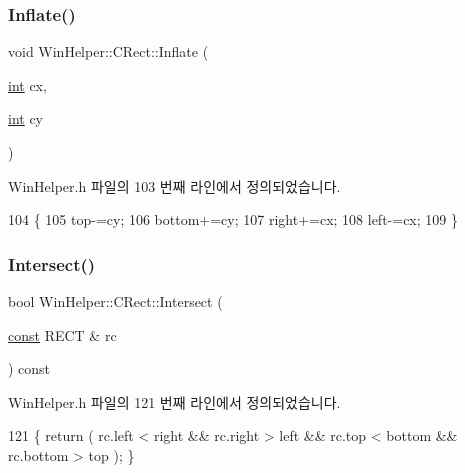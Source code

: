 \subsubsection{\texorpdfstring{Inflate()}{Inflate()}}
{\footnotesize\ttfamily void Win\+Helper\+::\+C\+Rect\+::\+Inflate (\begin{DoxyParamCaption}\item[{\mbox{\hyperlink{_util_8cpp_a0ef32aa8672df19503a49fab2d0c8071}{int}}}]{cx,  }\item[{\mbox{\hyperlink{_util_8cpp_a0ef32aa8672df19503a49fab2d0c8071}{int}}}]{cy }\end{DoxyParamCaption})\hspace{0.3cm}{\ttfamily [inline]}}



Win\+Helper.\+h 파일의 103 번째 라인에서 정의되었습니다.


\begin{DoxyCode}
104         \{
105           top-=cy;
106           bottom+=cy;
107           right+=cx;
108           left-=cx;
109         \}
\end{DoxyCode}
\mbox{\label{class_win_helper_1_1_c_rect_ae4e2111ea0d699b212744c15fc8ca560}} 
\subsubsection{\texorpdfstring{Intersect()}{Intersect()}}
{\footnotesize\ttfamily bool Win\+Helper\+::\+C\+Rect\+::\+Intersect (\begin{DoxyParamCaption}\item[{\mbox{\hyperlink{getopt1_8c_a2c212835823e3c54a8ab6d95c652660e}{const}} R\+E\+CT \&}]{rc }\end{DoxyParamCaption}) const\hspace{0.3cm}{\ttfamily [inline]}}



Win\+Helper.\+h 파일의 121 번째 라인에서 정의되었습니다.


\begin{DoxyCode}
121 \{ \textcolor{keywordflow}{return} ( rc.left < right && rc.right > left && rc.top < bottom && rc.bottom > top ); \}
\end{DoxyCode}
\mbox{\label{class_win_helper_1_1_c_rect_a6a78810f08fbb4559fee4910b531735a}} 
